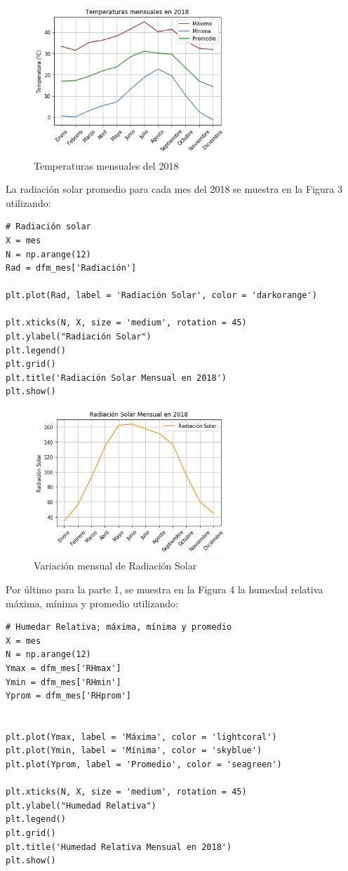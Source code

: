 \documentclass[11pt, spanish]{report}
\begin{document}
\begin{figure}[ht]
\caption{Temperaturas mensuales del 2018}
\centering
\includegraphics[width=0.65\textwidth]{figura2.png}
\end{figure}
La radiación solar promedio para cada mes del 2018 se muestra en la Figura 3 utilizando:
\begin{verbatim}
# Radiación solar
X = mes                 
N = np.arange(12)         
Rad = dfm_mes['Radiación']     

plt.plot(Rad, label = 'Radiación Solar', color = 'darkorange')   

plt.xticks(N, X, size = 'medium', rotation = 45)  
plt.ylabel("Radiación Solar")  
plt.legend()
plt.grid()
plt.title('Radiación Solar Mensual en 2018')
plt.show()
\end{verbatim}
\begin{figure}[ht]
\caption{Variación mensual de Radiación Solar}
\centering
\includegraphics[width=0.65\textwidth]{figura3.png}
\end{figure}
Por último para la parte 1, se muestra en la Figura 4 la humedad relativa máxima, mínima y promedio utilizando:
\begin{verbatim}
# Humedar Relativa; máxima, mínima y promedio
X = mes                 
N = np.arange(12)         
Ymax = dfm_mes['RHmax']     
Ymin = dfm_mes['RHmin']     
Yprom = dfm_mes['RHprom']     


plt.plot(Ymax, label = 'Máxima', color = 'lightcoral')   
plt.plot(Ymin, label = 'Mínima', color = 'skyblue')   
plt.plot(Yprom, label = 'Promedio', color = 'seagreen')   

plt.xticks(N, X, size = 'medium', rotation = 45)  
plt.ylabel("Humedad Relativa")  
plt.legend()
plt.grid()
plt.title('Humedad Relativa Mensual en 2018')
plt.show()
\end{verbatim}
\end{document}
